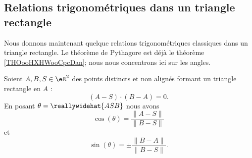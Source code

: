 \subsection{Relations trigonométriques dans un triangle rectangle}

Nous donnons maintenant quelque relations trigonométriques classiques dans un triangle rectangle. Le théorème de Pythagore est déjà le théorème \ref{THOooHXHWooCpcDan}; nous nous concentrons ici sur les angles.

\begin{proposition}
    Soient \( A,B,S\in \eR^2\) des points distincts et non alignés formant un triangle rectangle en \( A\) :
    \begin{equation}
        (A-S)\cdot (B-A)=0.
    \end{equation}
    En posant \( \theta=\reallywidehat{ASB}\) nous avons
    \begin{equation}
        \cos(\theta)=\frac{ \| A-S \| }{ \| B-S \| }
    \end{equation}
    et
    \begin{equation}
        \sin(\theta)=\pm\frac{ \| B-A \| }{ \| B-S \| }.
    \end{equation}
    
\end{proposition}

